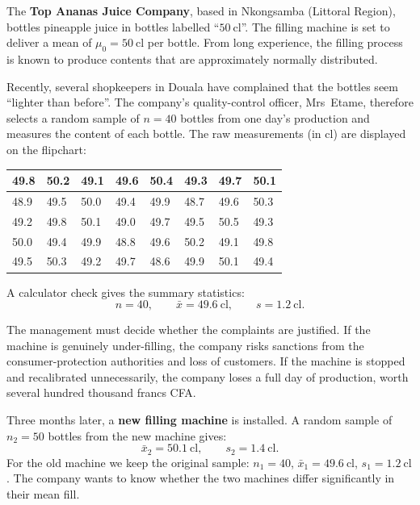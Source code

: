 \documentclass[11pt]{article}
\begin{document}
The \textbf{Top Ananas Juice Company}, based in Nkongsamba (Littoral Region), bottles pineapple juice in bottles labelled ``$50\ \mathrm{cl}$''. The filling machine is set to deliver a mean of $\mu_0 = 50\ \mathrm{cl}$ per bottle. From long experience, the filling process is known to produce contents that are approximately normally distributed.

Recently, several shopkeepers in Douala have complained that the bottles seem ``lighter than before''. The company's quality-control officer, Mrs~Etame, therefore selects a random sample of $n = 40$ bottles from one day's production and measures the content of each bottle. The raw measurements (in $\mathrm{cl}$) are displayed on the flipchart:

\begin{center}
\begin{tabularx}{\linewidth}{|X|X|X|X|X|X|X|X|}
\hline
\rowcolor{popblueL} 49.8 & 50.2 & 49.1 & 49.6 & 50.4 & 49.3 & 49.7 & 50.1 \\
\hline
48.9 & 49.5 & 50.0 & 49.4 & 49.9 & 48.7 & 49.6 & 50.3 \\
\hline
49.2 & 49.8 & 50.1 & 49.0 & 49.7 & 49.5 & 50.5 & 49.3 \\
\hline
50.0 & 49.4 & 49.9 & 48.8 & 49.6 & 50.2 & 49.1 & 49.8 \\
\hline
49.5 & 50.3 & 49.2 & 49.7 & 48.6 & 49.9 & 50.1 & 49.4 \\
\hline
\end{tabularx}
\end{center}

A calculator check gives the summary statistics:
\[
n = 40, \qquad \bar{x} = 49.6\ \mathrm{cl}, \qquad s = 1.2\ \mathrm{cl}.
\]

The management must decide whether the complaints are justified. If the machine is genuinely under-filling, the company risks sanctions from the consumer-protection authorities and loss of customers. If the machine is stopped and recalibrated unnecessarily, the company loses a full day of production, worth several hundred thousand francs CFA.

Three months later, a \textbf{new filling machine} is installed. A random sample of $n_2 = 50$ bottles from the new machine gives:
\[
\bar{x}_2 = 50.1\ \mathrm{cl}, \qquad s_2 = 1.4\ \mathrm{cl}.
\]
For the old machine we keep the original sample: $n_1 = 40$, $\bar{x}_1 = 49.6\ \mathrm{cl}$, $s_1 = 1.2\ \mathrm{cl}$. The company wants to know whether the two machines differ significantly in their mean fill.
\end{document}
